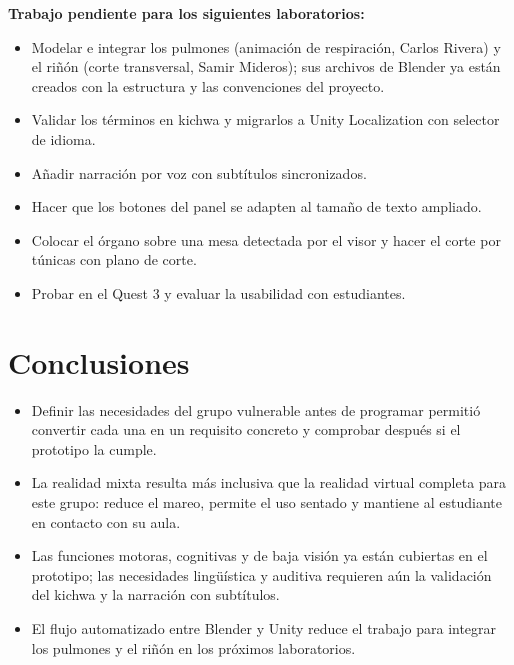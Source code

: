 \documentclass[11pt,a4paper]{article}
\begin{document}
\textbf{Trabajo pendiente para los siguientes laboratorios:}
\begin{itemize}
    \item Modelar e integrar los pulmones (animación de respiración, Carlos Rivera) y el riñón (corte transversal, Samir Mideros); sus archivos de Blender ya están creados con la estructura y las convenciones del proyecto.
    \item Validar los términos en kichwa y migrarlos a Unity Localization con selector de idioma.
    \item Añadir narración por voz con subtítulos sincronizados.
    \item Hacer que los botones del panel se adapten al tamaño de texto ampliado.
    \item Colocar el órgano sobre una mesa detectada por el visor y hacer el corte por túnicas con plano de corte.
    \item Probar en el Quest 3 y evaluar la usabilidad con estudiantes.
\end{itemize}

\section{Conclusiones}
\begin{itemize}
    \item Definir las necesidades del grupo vulnerable antes de programar permitió convertir cada una en un requisito concreto y comprobar después si el prototipo la cumple.
    \item La realidad mixta resulta más inclusiva que la realidad virtual completa para este grupo: reduce el mareo, permite el uso sentado y mantiene al estudiante en contacto con su aula.
    \item Las funciones motoras, cognitivas y de baja visión ya están cubiertas en el prototipo; las necesidades lingüística y auditiva requieren aún la validación del kichwa y la narración con subtítulos.
    \item El flujo automatizado entre Blender y Unity reduce el trabajo para integrar los pulmones y el riñón en los próximos laboratorios.
\end{itemize}

\end{document}
